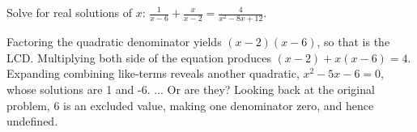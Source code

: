 \begin{example}
\exProblem
Solve for real solutions of $x$: $\frac{1}{x-6}+\frac{x}{x-2}=\frac{4}{x^2-8x+12}$.

\exSolution
Factoring the quadratic denominator yields $(x-2)(x-6)$, so that is the LCD.  Multiplying
both side of the equation produces $(x-2) + x(x-6)=4$.  Expanding combining like-terms
reveals another quadratic, $x^2-5x-6=0$, whose solutions are 1 and -6. ... Or are they?
Looking back at the original problem, 6 is an excluded value, making one denominator
zero, and hence undefined.
\end{example}

